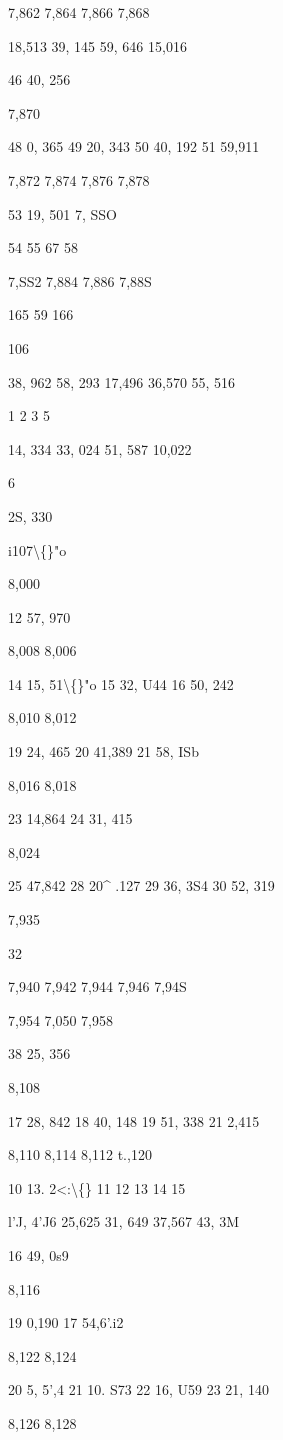 \documentclass[10pt,a4paper]{article}
\begin{document}
7,862
7,864
7,866
7,868

18,513
39, 145
59, 646
15,016

46 40, 256

7,870

48 0, 365
49 20, 343
50 40, 192
51 59,911

7,872
7,874
7,876
7,878

53 19, 501
7, SSO

54
55
67
58

7,SS2
7,884
7,886
7,88S

165 59
166

106

38, 962
58, 293
17,496
36,570
55, 516

1
2
3
5

14, 334
33, 024
51, 587
10,022

6

2S, 330

i107\textbackslash\{\}"o

8,000

12 57, 970

8,008
8,006

14 15, 51\textbackslash\{\}"o
15 32, U44
16 50, 242

8,010
8,012

19 24, 465
20 41,389
21 58, ISb

8,016
8,018

23 14,864
24 31, 415

8,024

25 47,842
28 20\textasciicircum{} .127
29 36, 3S4
30 52, 319

7,935

32

7,940
7,942
7,944
7,946
7,94S

7,954
7,050
7,958

38 25, 356

8,108

17 28, 842
18 40, 148
19 51, 338
21 2,415

8,110
8,114
8,112
t.,120

10 13. 2<:\textbackslash\{\}
11
12
13
14
15

l'J, 4'J6
25,625
31, 649
37,567
43, 3M

16 49, 0s9

8,116

19
0,190
17 54,6'.i2

8,122
8,124

20 5, 5',4
21 10. S73
22 16, U59
23 21, 140

8,126
8,128
\end{document}
